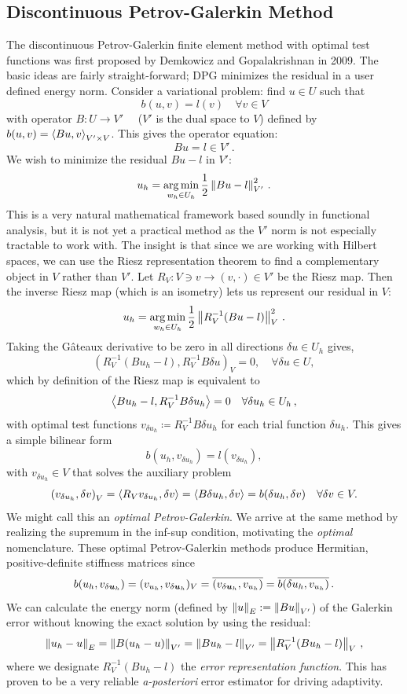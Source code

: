\documentclass[Dissertation.tex]{subfiles}
\begin{document}
\subsection{Discontinuous Petrov-Galerkin Method}
The discontinuous Petrov-Galerkin finite element method with optimal test functions
was first proposed by Demkowicz and Gopalakrishnan in 2009\cite{DPG2}.
The basic ideas are fairly straight-forward; DPG minimizes the residual in a user defined energy norm.
Consider a variational problem: find $u\in U$ such that
\[
b(u,v)=l(v) \quad\forall v\in V
\]
with operator $B:U\rightarrow V'\quad$ ($V'$ is the dual space to $V$) defined by $b(u,v)=\left\langle Bu,v \right\rangle_{V'\times V}$.
This gives the operator equation:
\[
Bu=l\in V'\,.
\]
We wish to minimize the residual $Bu-l$ in $V'$:
\[
u_h=\operatorname*{arg\,min}_{w_h\in U_h}\frac{1}{2}\left\| Bu-l \right\|^2_{V'}\,.
\]
This is a very natural mathematical framework based soundly in functional analysis, but it is not yet a practical method as the $V'$ norm is not
especially tractable to work with.
The insight is that since we are working with Hilbert spaces, we can use the Riesz representation theorem to find a complementary object
in $V$ rather than $V'$. Let $R_V:V\ni v\rightarrow(v,\cdot)\in V'$ be the Riesz map.
Then the inverse Riesz map (which is an isometry) lets us represent our residual in $V$:
\[
u_h=\operatorname*{arg\,min}_{w_h\in U_h}\frac{1}{2}\left\| R_V^{-1}(Bu-l) \right\|^2_{V}\,.
\]
Taking the G\^ateaux derivative to be zero in all directions $\delta u \in
U_h$ gives,
\[
\left(R_V^{-1}(Bu_h-l),R_V^{-1}B\delta u\right)_V = 0, \quad \forall \delta u \in U,
\]
which by definition of the Riesz map is equivalent to
\begin{equation*}
\left\langle Bu_h-l,R_V^{-1}B\delta u_h \right\rangle=0\quad\forall\delta u_h\in U_h\,,
\end{equation*}
with optimal test functions $v_{\delta u_h}\coloneqq R_V^{-1}B\delta u_h$ for each trial function $\delta u_h$.
This gives a simple bilinear form
\begin{equation*}
b(u_h,v_{\delta u_h})=l(v_{\delta u_h}),
\end{equation*}
with $v_{\delta u_h}\in V$ that solves the auxiliary problem
\begin{equation*}
\left( v_{\delta u_h},\delta v \right)_V=\left\langle R_Vv_{\delta u_h},\delta v \right\rangle
=\left\langle B\delta u_h,\delta v \right\rangle=b(\delta u_h,\delta v)\quad\forall\delta v\in V.
\end{equation*}
We might call this an \emph{optimal Petrov-Galerkin}.
We arrive at the same method by realizing the supremum in the inf-sup condition, motivating the \emph{optimal} nomenclature.
These optimal Petrov-Galerkin methods produce Hermitian, positive-definite stiffness matrices since
\[
b(u_h,v_{\delta\boldsymbol{u}_h})=(v_{u_h},v_{\delta\boldsymbol{u}_h})_V=\overline{(v_{\delta\boldsymbol{u}_h},v_{u_h})}=\overline{b(\delta u_h,v_{u_h})}\,.
\]
We can calculate the energy norm (defined by $\left\| u \right\|_E:=\left\| Bu \right\|_{V'}$) of the Galerkin error without knowing the exact solution by using the residual:
\[
\left\| u_h-u \right\|_E=\left\| B(u_h-u) \right\|_{V'}=\left\| Bu_h-l \right\|_{V'}=\left\| R_V^{-1}(Bu_h-l) \right\|_V\,,
\]
where we designate $R_V^{-1}(Bu_h-l)$ the \emph{error representation function}.
This has proven to be a very reliable \emph{a-posteriori} error estimator for driving adaptivity.
\end{document}
